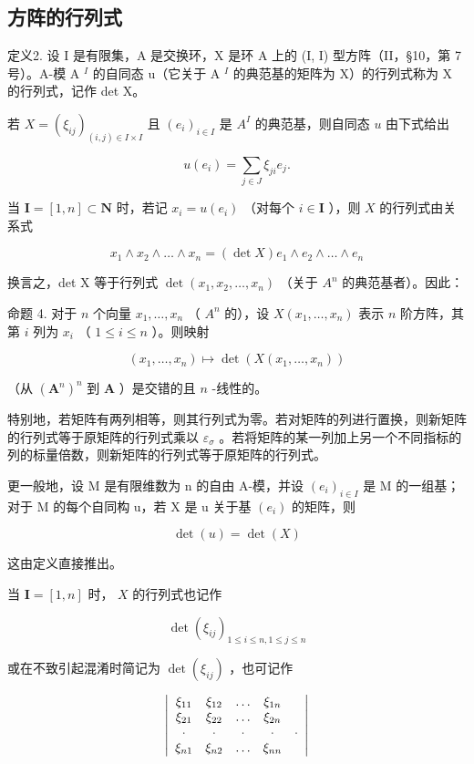 \subsection{方阵的行列式}

定义2. 设 I 是有限集，A 是交换环，X 是环 A 上的 (I, I) 型方阵（II，§10，第 7 号）。A-模 A \(^{I}\) 的自同态 u（它关于 A \(^{I}\) 的典范基的矩阵为 X）的行列式称为 X 的行列式，记作 det X。

若 \(X = (\xi_{ij})_{(i,j) \in I \times I}\) 且 \((e_i)_{i \in I}\) 是 \(A^I\) 的典范基，则自同态 \(u\) 由下式给出

\[
u (e _ {i}) = \sum_ {j \in J} \xi_ {j i} e _ {j}.
\]

当 \(\mathbf{I} = [1, n] \subset \mathbf{N}\) 时，若记 \(x_{i} = u(e_{i})\) （对每个 \(i \in \mathbf{I}\) ），则 \(X\) 的行列式由关系式

\[
x _ {1} \wedge x _ {2} \wedge \dots \wedge x _ {n} = (\det X) e _ {1} \wedge e _ {2} \wedge \dots \wedge e _ {n}\tag{6}
\]

换言之，det X 等于行列式 \(\det(x_{1}, x_{2}, \ldots, x_{n})\) （关于 \(A^{n}\) 的典范基者）。因此：

命题 4. 对于 \(n\) 个向量 \(x_1, \ldots, x_n\) （ \(A^n\) 的），设 \(X(x_1, \ldots, x_n)\) 表示 \(n\) 阶方阵，其第 \(i\) 列为 \(x_i\) （ \(1 \leqslant i \leqslant n\) ）。则映射

\[
(x _ {1}, \dots , x _ {n}) \mapsto \det (X (x _ {1}, \dots , x _ {n}))
\]

（从 \((\mathbf{A}^n)^n\) 到 \(\mathbf{A}\) ）是交错的且 \(n\) -线性的。

特别地，若矩阵有两列相等，则其行列式为零。若对矩阵的列进行置换，则新矩阵的行列式等于原矩阵的行列式乘以 \(\varepsilon_{\sigma}\) 。若将矩阵的某一列加上另一个不同指标的列的标量倍数，则新矩阵的行列式等于原矩阵的行列式。

更一般地，设 M 是有限维数为 n 的自由 A-模，并设 \((e_{i})_{i\in I}\) 是 M 的一组基；对于 M 的每个自同构 u，若 X 是 u 关于基 \((e_{i})\) 的矩阵，则

\[
\det (u) = \det (X)\tag{7}
\]

这由定义直接推出。

当 \(\mathbf{I} = [1, n]\) 时， \(X\) 的行列式也记作

\[
\det (\xi_ {i j}) _ {1 \leqslant i \leqslant n, 1 \leqslant j \leqslant n}
\]

或在不致引起混淆时简记为 \(\operatorname{det}(\xi_{ij})\) ，也可记作

\[
\left| \begin{array}{c c c c c} \xi_ {1 1} & \xi_ {1 2} & \ldots & \xi_ {1 n} \\ \xi_ {2 1} & \xi_ {2 2} & \ldots & \xi_ {2 n} \\ \cdot & \cdot & \cdot & \cdot & \cdot \\ \xi_ {n 1} & \xi_ {n 2} & \ldots & \xi_ {n n} \end{array} \right|
\]

